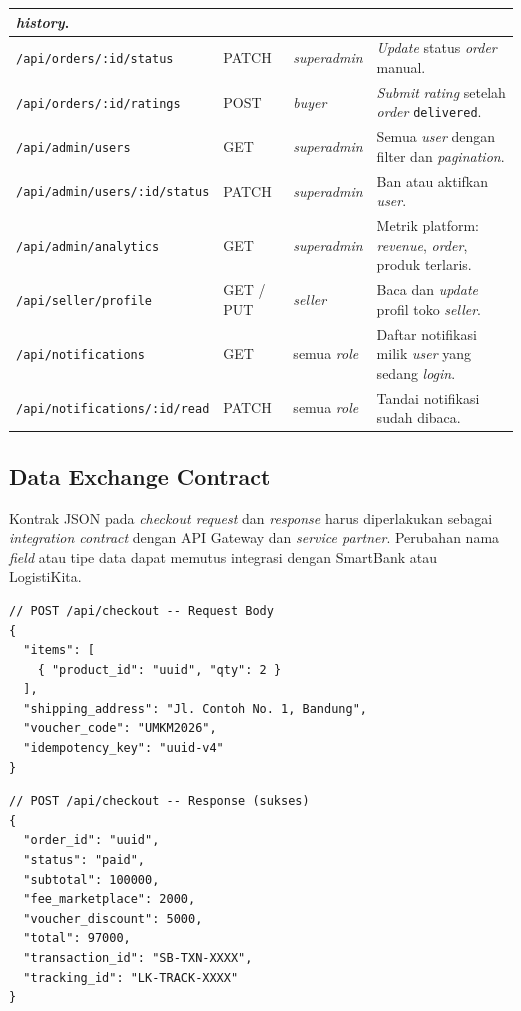 \begin{longtable}{|L{4.5cm}|L{1.5cm}|L{3.5cm}|L{5cm}|}
          \textit{history}. \\
    \hline
    \texttt{/api/orders/:id/status}
        & PATCH & \textit{superadmin}
        & \textit{Update} status \textit{order} manual. \\
    \hline
    \texttt{/api/orders/:id/ratings}
        & POST & \textit{buyer}
        & \textit{Submit} \textit{rating} setelah \textit{order} \texttt{delivered}. \\
    \hline
    \texttt{/api/admin/users}
        & GET & \textit{superadmin}
        & Semua \textit{user} dengan filter dan \textit{pagination}. \\
    \hline
    \texttt{/api/admin/users/:id/status}
        & PATCH & \textit{superadmin}
        & Ban atau aktifkan \textit{user}. \\
    \hline
    \texttt{/api/admin/analytics}
        & GET & \textit{superadmin}
        & Metrik platform: \textit{revenue}, \textit{order}, produk terlaris. \\
    \hline
    \texttt{/api/seller/profile}
        & GET / PUT & \textit{seller}
        & Baca dan \textit{update} profil toko \textit{seller}. \\
    \hline
    \texttt{/api/notifications}
        & GET & semua \textit{role}
        & Daftar notifikasi milik \textit{user} yang sedang \textit{login}. \\
    \hline
    \texttt{/api/notifications/:id/read}
        & PATCH & semua \textit{role}
        & Tandai notifikasi sudah dibaca. \\
    \hline
\end{longtable}

\subsection{Data Exchange Contract}

Kontrak JSON pada \textit{checkout request} dan \textit{response} harus
diperlakukan sebagai \textit{integration contract} dengan API Gateway dan
\textit{service partner}. Perubahan nama \textit{field} atau tipe data dapat
memutus integrasi dengan SmartBank atau LogistiKita.

\begin{lstlisting}[language={},caption={POST /api/checkout: Request Body},
    label={lst:checkout-req}]
// POST /api/checkout -- Request Body
{
  "items": [
    { "product_id": "uuid", "qty": 2 }
  ],
  "shipping_address": "Jl. Contoh No. 1, Bandung",
  "voucher_code": "UMKM2026",
  "idempotency_key": "uuid-v4"
}
\end{lstlisting}

\begin{lstlisting}[language={},caption={POST /api/checkout: Response (sukses)},
    label={lst:checkout-res}]
// POST /api/checkout -- Response (sukses)
{
  "order_id": "uuid",
  "status": "paid",
  "subtotal": 100000,
  "fee_marketplace": 2000,
  "voucher_discount": 5000,
  "total": 97000,
  "transaction_id": "SB-TXN-XXXX",
  "tracking_id": "LK-TRACK-XXXX"
}
\end{lstlisting}
